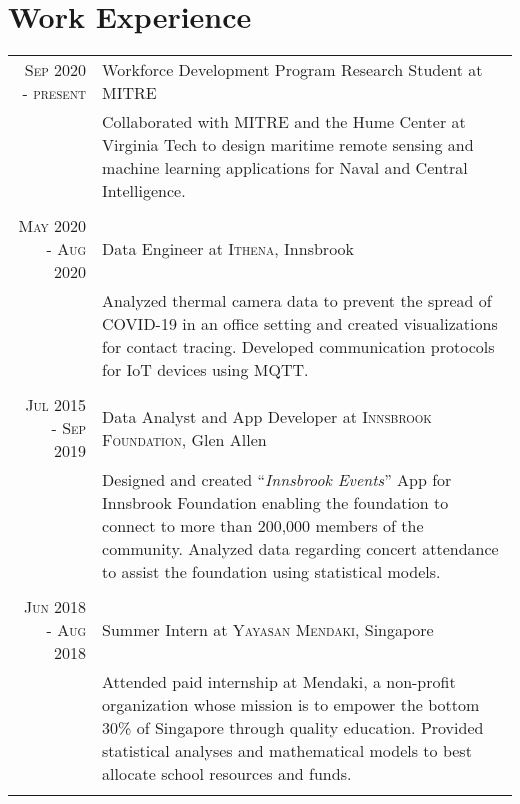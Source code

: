 \documentclass[a4paper,10.7pt]{article} %
\begin{document}

\section{Work Experience}

\begin{tabular}{r|p{11cm}}

\textsc{Sep 2020 - present} & Workforce Development Program Research Student at \textsc{MITRE} \emph{}\\
& \footnotesize{Collaborated with MITRE and the Hume Center at Virginia Tech to design maritime remote sensing and machine learning applications for Naval and Central Intelligence.
}\\
\multicolumn{2}{c}{} \\


\textsc{May 2020 - Aug 2020} & Data Engineer at \textsc{Ithena}, Innsbrook \emph{}\\
& \footnotesize{Analyzed thermal camera data to prevent the spread of COVID-19 in an office setting and created visualizations for contact tracing. Developed communication protocols for IoT devices using MQTT.
}\\
\multicolumn{2}{c}{} \\


\textsc{Jul 2015 - Sep 2019} & Data Analyst and App Developer at \textsc{Innsbrook Foundation}, Glen Allen \emph{}\\
& \footnotesize{Designed and created “\emph{Innsbrook Events}” App  for Innsbrook Foundation  enabling the foundation to connect to more than 200,000 members of the community. Analyzed data regarding concert attendance to assist the foundation using statistical models.
}\\
\multicolumn{2}{c}{} \\


\textsc{Jun 2018 - Aug 2018} & Summer Intern at \textsc{Yayasan Mendaki}, Singapore \emph{}\\
& \footnotesize{Attended paid internship at Mendaki, a non-proﬁt organization whose mission is to empower the bottom 30\% of Singapore through quality education. Provided statistical analyses and mathematical models to best allocate school resources and funds.
}\\
\multicolumn{2}{c}{} \\


\end{tabular}
\end{document}

